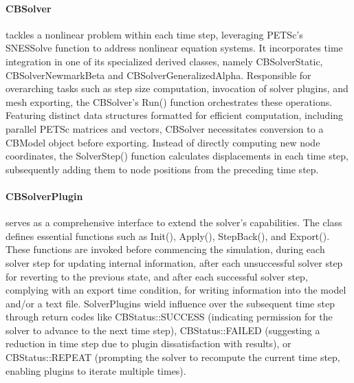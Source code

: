 \paragraph{CBSolver} tackles a nonlinear problem within each time step, leveraging PETSc's SNESSolve function to address nonlinear equation systems. 
It incorporates time integration in one of its specialized derived classes, namely CBSolverStatic, CBSolverNewmarkBeta and CBSolverGeneralizedAlpha.
Responsible for overarching tasks such as step size computation, invocation of solver plugins, and mesh exporting, the CBSolver's Run() function orchestrates these operations. 
Featuring distinct data structures formatted for efficient computation, including parallel PETSc matrices and vectors, CBSolver necessitates conversion to a CBModel object before exporting. 
Instead of directly computing new node coordinates, the SolverStep() function calculates displacements in each time step, subsequently adding them to node positions from the preceding time step.

\paragraph{CBSolverPlugin} serves as a comprehensive interface to extend the solver's capabilities. 
The class defines essential functions such as Init(), Apply(), StepBack(), and Export(). 
These functions are invoked before commencing the simulation, during each solver step for updating internal information, after each unsuccessful solver step for reverting to the previous state, and after each successful solver step, complying with an export time condition, for writing information into the model and/or a text file. 
SolverPlugins wield influence over the subsequent time step through return codes like CBStatus::SUCCESS (indicating permission for the solver to advance to the next time step), CBStatus::FAILED (suggesting a reduction in time step due to plugin dissatisfaction with results), or CBStatus::REPEAT (prompting the solver to recompute the current time step, enabling plugins to iterate multiple times).

